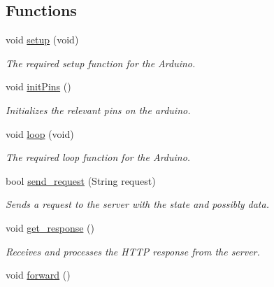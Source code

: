 \subsection*{Functions}
\begin{DoxyCompactItemize}
\item 
void \hyperlink{compressed_sensing_8ino_a7dfd9b79bc5a37d7df40207afbc5431f}{setup} (void)
\begin{DoxyCompactList}\small\item\em The required setup function for the Arduino. \end{DoxyCompactList}\item 
\hypertarget{compressed_sensing_8ino_a4c3b7689564254274a0e3a2a1771d473}{void \hyperlink{compressed_sensing_8ino_a4c3b7689564254274a0e3a2a1771d473}{init\+Pins} ()}\label{compressed_sensing_8ino_a4c3b7689564254274a0e3a2a1771d473}

\begin{DoxyCompactList}\small\item\em Initializes the relevant pins on the arduino. \end{DoxyCompactList}\item 
void \hyperlink{compressed_sensing_8ino_a0b33edabd7f1c4e4a0bf32c67269be2f}{loop} (void)
\begin{DoxyCompactList}\small\item\em The required loop function for the Arduino. \end{DoxyCompactList}\item 
bool \hyperlink{compressed_sensing_8ino_a5f527ab54a51b215bb0f3492df22ab9b}{send\+\_\+request} (String request)
\begin{DoxyCompactList}\small\item\em Sends a request to the server with the state and possibly data. \end{DoxyCompactList}\item 
void \hyperlink{compressed_sensing_8ino_adbf1a7054439ab0113ab50cc2fb28c19}{get\+\_\+response} ()
\begin{DoxyCompactList}\small\item\em Receives and processes the H\+T\+T\+P response from the server. \end{DoxyCompactList}\item 
\hypertarget{compressed_sensing_8ino_a7de2a543986e45b9083c69f6138bf079}{void \hyperlink{compressed_sensing_8ino_a7de2a543986e45b9083c69f6138bf079}{forward} ()}\label{compressed_sensing_8ino_a7de2a543986e45b9083c69f6138bf079}


\end{DoxyCompactItemize}
